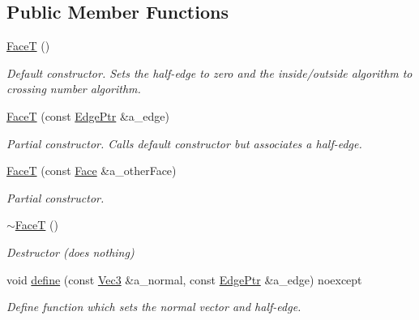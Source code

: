 \subsection*{Public Member Functions}
\begin{DoxyCompactItemize}
\item 
\mbox{\label{classDcel_1_1FaceT_ad26587e282563bc4e8c6559b2551627f}} 
\hyperlink{classDcel_1_1FaceT_ad26587e282563bc4e8c6559b2551627f}{FaceT} ()
\begin{DoxyCompactList}\small\item\em Default constructor. Sets the half-\/edge to zero and the inside/outside algorithm to crossing number algorithm. \end{DoxyCompactList}\item 
\hyperlink{classDcel_1_1FaceT_a9111394950a9fb2f8b918423416c83bd}{FaceT} (const \hyperlink{classDcel_1_1FaceT_a0f3448c4cf108341e48029b8040c7cec}{Edge\+Ptr} \&a\+\_\+edge)
\begin{DoxyCompactList}\small\item\em Partial constructor. Calls default constructor but associates a half-\/edge. \end{DoxyCompactList}\item 
\hyperlink{classDcel_1_1FaceT_a0c318a29cae34ba4105235fd55d22b39}{FaceT} (const \hyperlink{classDcel_1_1FaceT_a01d61241adc3c536c364084740b8c6da}{Face} \&a\+\_\+other\+Face)
\begin{DoxyCompactList}\small\item\em Partial constructor. \end{DoxyCompactList}\item 
\mbox{\label{classDcel_1_1FaceT_a56988526e98a2626c644117e9298fd4b}} 
\hyperlink{classDcel_1_1FaceT_a56988526e98a2626c644117e9298fd4b}{$\sim$\+FaceT} ()
\begin{DoxyCompactList}\small\item\em Destructor (does nothing) \end{DoxyCompactList}\item 
void \hyperlink{classDcel_1_1FaceT_a44b70fa51382ef625d110bbad64b7442}{define} (const \hyperlink{classDcel_1_1FaceT_ade9c182834ec6f18a0e17b8140308db2}{Vec3} \&a\+\_\+normal, const \hyperlink{classDcel_1_1FaceT_a0f3448c4cf108341e48029b8040c7cec}{Edge\+Ptr} \&a\+\_\+edge) noexcept
\begin{DoxyCompactList}\small\item\em Define function which sets the normal vector and half-\/edge. \end{DoxyCompactList}\item 

\end{DoxyCompactItemize}
